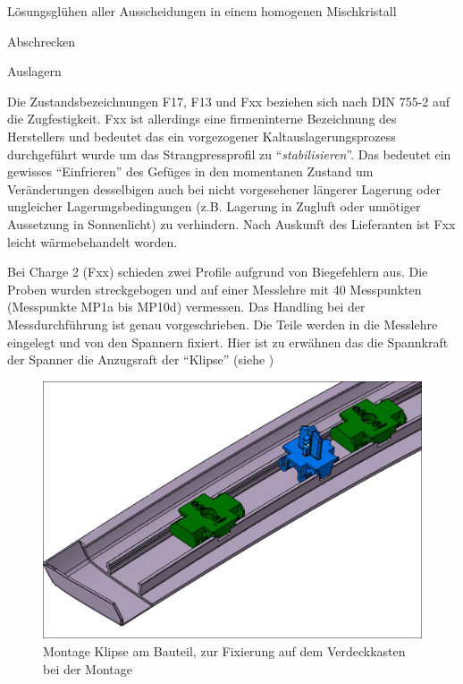 \documentclass[12pt,a4paper,parskip,twoside,BCOR5mm,headsepline]{scrartcl}
\begin{document}
\begin{enumerate*}
 \item Lösungsglühen aller Ausscheidungen in einem homogenen Mischkristall 
 \item Abschrecken
 \item Auslagern 
 \end{enumerate*}
 
   
 
 

Die Zustandsbezeichnungen F17, F13 und Fxx beziehen sich nach DIN 755-2 auf die Zugfestigkeit. Fxx ist allerdings eine firmeninterne Bezeichnung des Herstellers und bedeutet das ein  vorgezogener Kaltauslagerungsprozess durchgeführt wurde um das Strangpressprofil zu "`\emph{stabilisieren}"'. Das bedeutet ein gewisses "`Einfrieren"' des Gefüges in den momentanen Zustand um Veränderungen desselbigen auch bei nicht vorgesehener längerer Lagerung oder ungleicher Lagerungsbedingungen (z.B. Lagerung in Zugluft oder unnötiger Aussetzung in Sonnenlicht) zu verhindern. Nach Auskunft des Lieferanten ist Fxx leicht wärmebehandelt worden.


 Bei Charge 2 (Fxx) schieden zwei Profile aufgrund von Biegefehlern aus. Die Proben wurden streckgebogen und auf einer Messlehre  mit 40 Messpunkten (Messpunkte MP1a bis MP10d) vermessen. Das Handling bei der Messdurchführung ist genau vorgeschrieben. Die Teile werden in die Messlehre eingelegt und von den Spannern fixiert. Hier ist zu erwähnen das die Spannkraft der Spanner die Anzugsraft der "`Klipse"' (siehe )
 \begin{figure}[H]
 \centering
 \includegraphics[width=.8\textwidth]{klip}
 \caption{Montage Klipse am Bauteil, zur Fixierung auf dem Verdeckkasten bei der Montage}
 \label{fig:klip}
 \end{figure}
 
\end{document}
